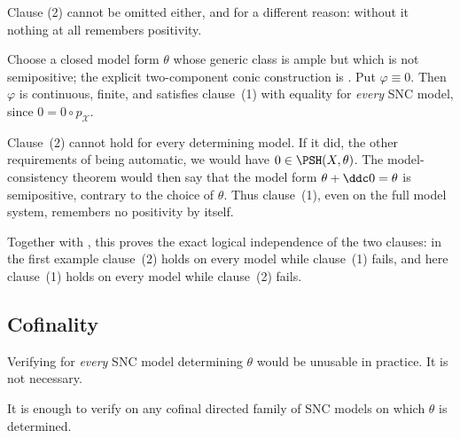 Clause (2) cannot be omitted either, and for a different reason: without it
nothing at all remembers positivity.

\begin{example}
\label{ex:ch21-clause-two-needed}
Choose a closed model form $\theta$ whose generic class is ample but which
is not semipositive; the explicit two-component conic construction is
.  Put $\varphi\equiv0$.
Then $\varphi$ is continuous, finite, and satisfies clause~(1) with
equality for \emph{every} SNC model, since
$0=0\circ p_{\mathcal X}$.

Clause~(2) cannot hold for every determining model.  If it did, the other
requirements of  being automatic, we would have
$0\in\PSH(X,\theta)$.  The model-consistency theorem
 would then say that the model form
$\theta+\ddc0=\theta$ is semipositive, contrary to the choice of
$\theta$.  Thus clause~(1), even on the full model system, remembers no
positivity by itself.

Together with , this proves the exact logical
independence of the two clauses: in the first example clause~(2) holds on
every model while clause~(1) fails, and here clause~(1) holds on every model
while clause~(2) fails.
\end{example}

\subsection{Cofinality}
\label{sec:ch21-cofinality}

Verifying  for \emph{every} SNC model determining
$\theta$ would be unusable in practice.  It is not necessary.

\begin{proposition}\label{prop:ch21-cofinal-independence}
It is enough to verify  on any cofinal directed family
of SNC models on which $\theta$ is determined.
\end{proposition}

